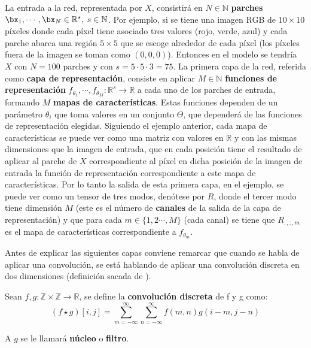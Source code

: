 La entrada a la red, representada por $X$, consistirá en $N\in\mathbb{N}$ \textbf{parches} $\bx_1,\cdots ,\bx_N\in\mathbb{R}^s,\; s\in \mathbb{N}$. Por ejemplo, si se tiene una imagen RGB de $10\times10$ píxeles donde cada píxel tiene asociado tres valores (rojo, verde, azul) y cada parche abarca una región $5\times5$ que se escoge alrededor de cada píxel (los píxeles fuera de la imagen se toman como $(0,0,0)$). Entonces en el modelo se tendría $X$ con $N=100$ parches y con $s=5\cdot5\cdot3=75$. La primera capa de la red, referida como \textbf{capa de representación}, consiste en aplicar $M\in\mathbb{N}$ \textbf{funciones de representación} $f_{\theta_1},\cdots ,f_{\theta_M}:\mathbb{R}^s\rightarrow\mathbb{R}$ a cada uno de los parches de entrada, formando $M$ \textbf{mapas de características}. Estas funciones dependen de un parámetro $\theta_i$ que toma valores en un conjunto $\Theta$, que dependerá de las funciones de representación elegidas. Siguiendo el ejemplo anterior, cada mapa de características se puede ver como una matriz con valores en $\mathbb{R}$ y con las mismas dimensiones que la imagen de entrada, que en cada posición tiene el resultado de aplicar al parche de $X$ correspondiente al píxel en dicha posición de la imagen de entrada la función de representación correspondiente a este mapa de características. Por lo tanto la salida de esta primera capa, en el ejemplo, se puede ver como un tensor de tres modos, denótese por $R$, donde el tercer modo tiene dimensión $M$ (este es el número de \textbf{canales} de la salida de la capa de representación) y que para cada $m \in \{1,2\cdots ,M\}$ (cada canal) se tiene que $R_{:,:,m}$ es el mapa de características correspondiente a $f_{\theta_m}$.

Antes de explicar las siguientes capas conviene remarcar que cuando se habla de aplicar una convolución, se está hablando de aplicar una convolución discreta en dos dimensiones (definición sacada de \cite{Goodfellow-et-al-2016}).

\begin{definicion} \label{def:operadorConvolucion}
Sean $f,g:\mathbb{Z}\times\mathbb{Z}\rightarrow\mathbb{R}$, se define la \textbf{convolución discreta} de f y g como:
\begin{equation}
(f\star g)[i,j] = \sum_{m=-\infty}^{\infty}\sum_{n=-\infty}^{\infty}f(m,n)g(i-m,j-n)
\end{equation}

A $g$ se le llamará \textbf{núcleo} o \textbf{filtro}.
\end{definicion} 

